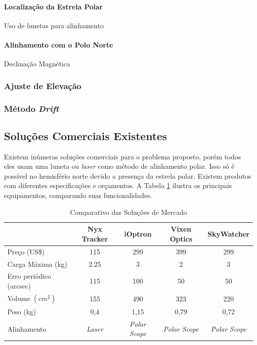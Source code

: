 \paragraph{Localização da Estrela Polar}
Uso de lunetas para alinhamento

\paragraph{Alinhamento com o Polo Norte}
Declinação Magnética

\subsubsection{Ajuste de Elevação}

\subsubsection{Método \textit{Drift}}

\subsection{Soluções Comerciais Existentes}

Existem inúmeras soluções comerciais para o problema proposto, porém todos eles usam uma luneta ou \textit{laser} como método de alinhamento polar. Isso só é possível no hemisfério norte devido a presença da estrela polar. Existem produtos com diferentes especificações e orçamentos. A Tabela \ref{tabela_benchmark} ilustra os principais equipamentos, comparando suas funcionalidades. 

\begin{table}[htb]
	\caption{Comparativo das Soluções de Mercado}
	\begin{tabular}{l|cccc}
		& Nyx Tracker & iOptron & Vixen Optics & SkyWatcher \\ \hline
		Preço (US\$) & 115 & 299 & 399 & 299 \\\hline
		Carga Máxima (kg) & 2.25 & 3 & 2 & 3 \\\hline
		Erro periódico (arcsec) & 115 & 100 & 50 & 50 \\\hline
		Volume $ (cm^2) $ & 155 & 490 & 323 & 220 \\\hline
		Peso (kg) & 0,4 & 1,15 & 0,79 & 0,72 \\\hline
		Alinhamento & \textit{Laser} & \textit{Polar Scope} & \textit{Polar Scope} & \textit{Polar Scope} \\
	\end{tabular}
	\label{tabela_benchmark}
\end{table}

